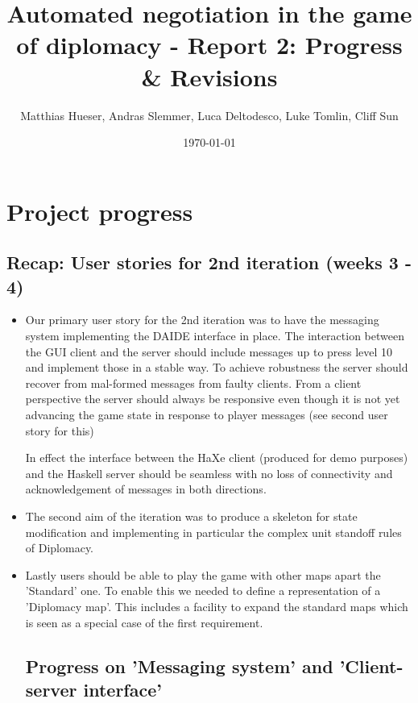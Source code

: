 \documentclass[12pt]{article}
\title{Automated negotiation in the game of diplomacy - Report 2: Progress \& Revisions}
\author{Matthias Hueser, Andras Slemmer, Luca Deltodesco, Luke Tomlin, Cliff Sun}
\date{\today}
\begin{document}
\maketitle

\section{Project progress}

\subsection{Recap: User stories for 2nd iteration (weeks 3 - 4)}

\begin{itemize}

\item Our primary user story for the 2nd iteration was to have the messaging system
implementing the DAIDE interface in place. The interaction between
the GUI client and the server should include messages up to press level
10 and implement those in a stable way. To achieve robustness the server should
recover from mal-formed messages from faulty clients. From a client perspective
the server should always be responsive even though it is not yet advancing the game state in
response to player messages (see second user story for this)

In effect the interface between the HaXe client (produced for demo purposes)
and the Haskell server should be seamless with no loss of connectivity and 
acknowledgement of messages in both directions.

\item The second aim of the iteration was to produce a skeleton for state modification
and implementing in particular the complex unit standoff rules of Diplomacy.

\item Lastly users should be able to play the game with other maps apart the 'Standard' one.
To enable this we needed to define a representation of a 'Diplomacy map'. This includes
a facility to expand the standard maps which is seen as a special case of the
first requirement.

\subsection{Progress on 'Messaging system' and 'Client-server interface'}

\begin{itemize}


\end{itemize}
\end{itemize}
\end{document}
